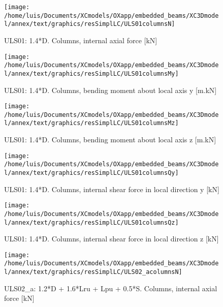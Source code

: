 \begin{figure}
\begin{center}
\texttt{[image: /home/luis/Documents/XCmodels/OXapp/embedded\_beams/XC3Dmodel/annex/text/graphics/resSimplLC/ULS01columnsN]}
\caption{ULS01: 1.4*D. Columns, internal axial force [kN]}
\end{center}
\end{figure}
\begin{figure}
\begin{center}
\texttt{[image: /home/luis/Documents/XCmodels/OXapp/embedded\_beams/XC3Dmodel/annex/text/graphics/resSimplLC/ULS01columnsMy]}
\caption{ULS01: 1.4*D. Columns, bending moment about local axis y [m.kN]}
\end{center}
\end{figure}
\begin{figure}
\begin{center}
\texttt{[image: /home/luis/Documents/XCmodels/OXapp/embedded\_beams/XC3Dmodel/annex/text/graphics/resSimplLC/ULS01columnsMz]}
\caption{ULS01: 1.4*D. Columns, bending moment about local axis z [m.kN]}
\end{center}
\end{figure}
\begin{figure}
\begin{center}
\texttt{[image: /home/luis/Documents/XCmodels/OXapp/embedded\_beams/XC3Dmodel/annex/text/graphics/resSimplLC/ULS01columnsQy]}
\caption{ULS01: 1.4*D. Columns, internal shear force in local direction y [kN]}
\end{center}
\end{figure}
\begin{figure}
\begin{center}
\texttt{[image: /home/luis/Documents/XCmodels/OXapp/embedded\_beams/XC3Dmodel/annex/text/graphics/resSimplLC/ULS01columnsQz]}
\caption{ULS01: 1.4*D. Columns, internal shear force in local direction z [kN]}
\end{center}
\end{figure}
\clearpage
\begin{figure}
\begin{center}
\texttt{[image: /home/luis/Documents/XCmodels/OXapp/embedded\_beams/XC3Dmodel/annex/text/graphics/resSimplLC/ULS02\_acolumnsN]}
\caption{ULS02_a: 1.2*D + 1.6*Lru + Lpu + 0.5*S. Columns, internal axial force [kN]}
\end{center}
\end{figure}
